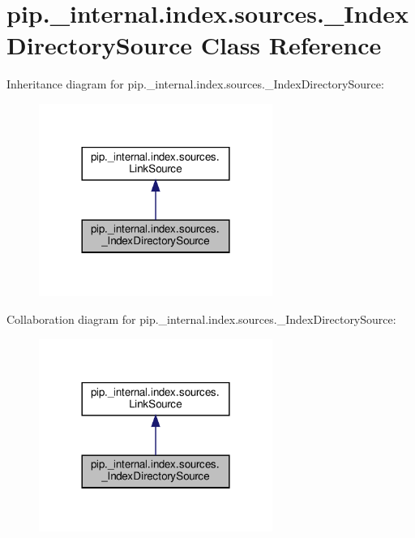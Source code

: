 \hypertarget{classpip_1_1__internal_1_1index_1_1sources_1_1__IndexDirectorySource}{}\section{pip.\+\_\+internal.\+index.\+sources.\+\_\+\+Index\+Directory\+Source Class Reference}
\label{classpip_1_1__internal_1_1index_1_1sources_1_1__IndexDirectorySource}


Inheritance diagram for pip.\+\_\+internal.\+index.\+sources.\+\_\+\+Index\+Directory\+Source\+:
\nopagebreak
\begin{figure}[H]
\begin{center}
\leavevmode
\includegraphics[width=216pt]{classpip_1_1__internal_1_1index_1_1sources_1_1__IndexDirectorySource__inherit__graph}
\end{center}
\end{figure}


Collaboration diagram for pip.\+\_\+internal.\+index.\+sources.\+\_\+\+Index\+Directory\+Source\+:
\nopagebreak
\begin{figure}[H]
\begin{center}
\leavevmode
\includegraphics[width=216pt]{classpip_1_1__internal_1_1index_1_1sources_1_1__IndexDirectorySource__coll__graph}
\end{center}
\end{figure}
